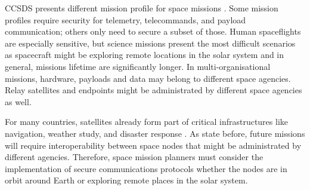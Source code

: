  
CCSDS presents different mission profile for space missions \cite{book2012architecture}. Some mission profiles require security for telemetry, telecommands, and payload communication; others only need to secure a subset of those. Human spaceflights are especially sensitive, but science missions present the most difficult scenarios as spacecraft might be exploring remote locations in the solar system and in general, missions lifetime are significantly longer. In multi-organisational missions, hardware, payloads and data may belong to different space agencies. Relay satellites and endpoints might be administrated by different space agencies as well.

For many countries, satellites already form part of critical infrastructures like navigation, weather study, and disaster response \cite{book2006security}.  As state before, future missions will require interoperability between space nodes that might be administrated by different agencies. Therefore, space mission planners must consider the implementation of secure communications protocols whether the nodes are in orbit around Earth or exploring remote places in the solar system.


 
 
 

